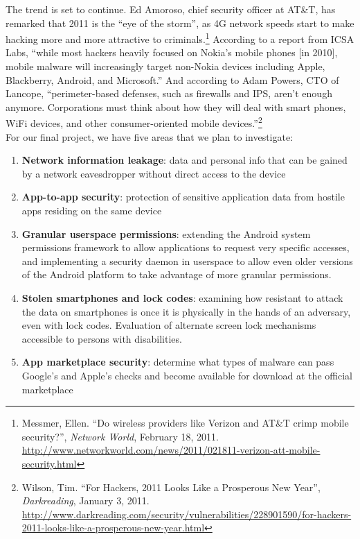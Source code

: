 \documentclass[11pt]{article}
\begin{document}
The trend is set to continue. Ed Amoroso, chief security officer at AT\&T, has
remarked that 2011 is the ``eye of the storm'', as 4G network speeds start to
make hacking more and more attractive to criminals.\footnote{Messmer, Ellen.
``Do wireless providers like Verizon and AT\&T crimp mobile security?'',
\textit{Network World}, February 18, 2011.
\url{http://www.networkworld.com/news/2011/021811-verizon-att-mobile-security.html}}
According to a report from ICSA Labs, ``while most hackers heavily focused on
Nokia's mobile phones [in 2010], mobile malware will increasingly target
non-Nokia devices including Apple, Blackberry, Android, and Microsoft.'' And
according to Adam Powers, CTO of Lancope, ``perimeter-based defenses, such as
firewalls and IPS, aren't enough anymore. Corporations must think about how
they will deal with smart phones, WiFi devices, and other consumer-oriented
mobile devices.''\footnote{Wilson, Tim. ``For Hackers, 2011 Looks Like a
Prosperous New Year'', \textit{Darkreading}, January 3, 2011.
\url{http://www.darkreading.com/security/vulnerabilities/228901590/for-hackers-2011-looks-like-a-prosperous-new-year.html}}\\

For our final project, we have five areas that we plan to investigate:
\begin{enumerate}
\item \textbf{Network information leakage}: data and personal info that can be
gained by a network eavesdropper without direct access to the device
\item \textbf{App-to-app security}: protection of sensitive application data
from hostile apps residing on the same device
\item \textbf{Granular userspace permissions}: extending the Android system
permissions framework to allow applications to request very specific accesses,
and implementing a security daemon in userspace to allow even older versions
of the Android platform to take advantage of more granular permissions.
\item \textbf{Stolen smartphones and lock codes}: examining how resistant to
attack the data on smartphones is once it is physically in the hands of an
adversary, even with lock codes. Evaluation of alternate screen lock
mechanisms accessible to persons with disabilities.
\item \textbf{App marketplace security}: determine what types of malware can
pass Google's and Apple's checks and become available for download at the
official marketplace
\end{enumerate}
\end{document}
